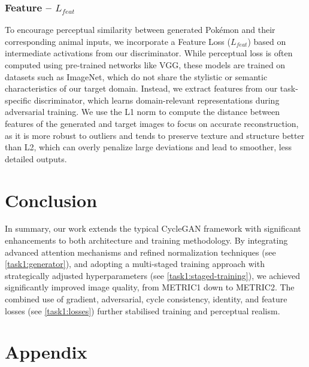 \documentclass[twoside,english,notitlepage]{report}
\begin{document}
\subsubsection{Feature – $L_{feat}$}
To encourage perceptual similarity between generated Pokémon and their corresponding animal inputs, we incorporate a Feature Loss ($L_{feat}$) based on intermediate activations from our discriminator. While perceptual loss is often computed using pre-trained networks like VGG, these models are trained on datasets such as ImageNet, which do not share the stylistic or semantic characteristics of our target domain. Instead, we extract features from our task-specific discriminator, which learns domain-relevant representations during adversarial training. We use the L1 norm to compute the distance between features of the generated and target images to focus on accurate reconstruction, as it is more robust to outliers and tends to preserve texture and structure better than L2, which can overly penalize large deviations and lead to smoother, less detailed outputs.

\section{Conclusion}
In summary, our work extends the typical CycleGAN framework with significant enhancements to both architecture and training methodology. By integrating advanced attention mechanisms and refined normalization techniques (see \ref{task1:generator}), and adopting a multi-staged training approach with strategically adjusted hyperparameters (see \ref{task1:staged-training}), we achieved significantly improved image quality, from METRIC1 down to METRIC2. The combined use of gradient, adversarial, cycle consistency, identity, and feature losses (see \ref{task1:losses}) further stabilised training and perceptual realism. 

\section{Appendix}\label{task1:appendix}
\end{document}
